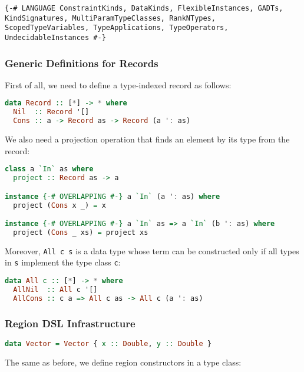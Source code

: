 \begin{lstlisting}
{-# LANGUAGE ConstraintKinds, DataKinds, FlexibleInstances, GADTs, KindSignatures, MultiParamTypeClasses, RankNTypes, ScopedTypeVariables, TypeApplications, TypeOperators, UndecidableInstances #-}
\end{lstlisting}

\hypertarget{generic-definitions-for-records}{%
\subsubsection{Generic Definitions for
Records}\label{generic-definitions-for-records}}

First of all, we need to define a type-indexed record as follows:

\begin{lstlisting}[language=Haskell]
data Record :: [*] -> * where
  Nil  :: Record '[]
  Cons :: a -> Record as -> Record (a ': as)
\end{lstlisting}
\noindent
We also need a projection operation that finds an element by its type
from the record:

\begin{lstlisting}[language=Haskell]
class a `In` as where
  project :: Record as -> a

instance {-# OVERLAPPING #-} a `In` (a ': as) where
  project (Cons x _) = x

instance {-# OVERLAPPING #-} a `In` as => a `In` (b ': as) where
  project (Cons _ xs) = project xs
\end{lstlisting}
\noindent
Moreover, \lstinline!All c s! is a data type whose term
can be constructed only if all types in \lstinline!s!
implement the type class \lstinline!c!:

\begin{lstlisting}[language=Haskell]
data All c :: [*] -> * where
  AllNil  :: All c '[]
  AllCons :: c a => All c as -> All c (a ': as)
\end{lstlisting}

\hypertarget{region-dsl-infrastructure}{%
\subsubsection{Region DSL Infrastructure}\label{region-dsl-infrastructure}}

\begin{lstlisting}[language=Haskell]
data Vector = Vector { x :: Double, y :: Double }
\end{lstlisting}
\noindent
The same as before, we define region constructors in a type class:

